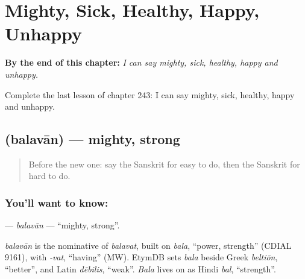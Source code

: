 
\chapter{Mighty, Sick, Healthy, Happy, Unhappy}
\label{ch:sa-mighty-sick-healthy-happy-unhappy}

\begin{chapteropening}
\textbf{By the end of this chapter:} \emph{I can say mighty, sick, healthy, happy and unhappy.}

Complete the last lesson of chapter 243: I can say mighty, sick, healthy, happy and unhappy.
\end{chapteropening}

\section[\texorpdfstring{\sk{बलवान्} (balavān)}{बलवान् (balavān)}]{ (balavān) — mighty, strong}

\label{lesson:SA-C243-balavan}



\begin{quote}
Before the new one: say the Sanskrit for easy to do, then the Sanskrit for hard to do.
\end{quote}

\subsection*{You'll want to know: }
\textbf{} — \emph{balavān} — \textquotedblleft{}mighty, strong\textquotedblright{}.

\begin{cousinweb}
\emph{balavān} is the nominative of \emph{balavat}, built on \emph{bala}, \textquotedblleft{}power, strength\textquotedblright{} (CDIAL 9161), with \emph{-vat}, \textquotedblleft{}having\textquotedblright{} (MW). EtymDB sets \emph{bala} beside Greek \emph{beltiōn}, \textquotedblleft{}better\textquotedblright{}, and Latin \emph{dēbilis}, \textquotedblleft{}weak\textquotedblright{}. \emph{Bala} lives on as Hindi \emph{bal}, \textquotedblleft{}strength\textquotedblright{}.
\end{cousinweb}

